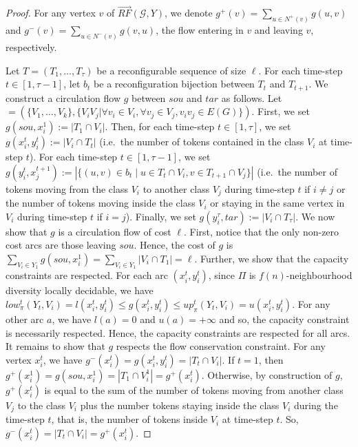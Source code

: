 \begin{proof}
  For any vertex $v$ of $\overrightarrow{RF}(\mathcal{G},Y)$, we denote $g^+(v)=\sum\limits_{u \in N^+(v)} g(u,v)$ and $g^-(v)= \sum\limits_{u \in N^-(v)} g(v,u)$, the flow entering in $v$ and leaving $v$, respectively.

  Let $T = (T_1,\dots,T_\tau)$ be a reconfigurable sequence of size $\ell$. For each time-step $t \in [1,\tau-1]$, let $b_t$ be a reconfiguration bijection between $T_t$ and $T_{t+1}$.  We construct a circulation flow $g$ between $sou$ and $tar$ as follows.
  Let \tndg$=(\{V_1,\ldots,V_k\}, \{V_iV_j | \forall v_i\in V_i, \forall v_j\in V_j, v_iv_j\in E(G)\})$. First, we set $g(sou,x^1_i):= |T_1 \cap V_i|$.
  Then, for each time-step $t \in [1,\tau]$, we set $g(x^t_i,y^t_i) := |V_i \cap T_t|$ (i.e.\ the number of tokens contained in the class $V_i$ at time-step $t$).
  For each time-step $t \in [1,\tau-1]$, we set
    $g(y^t_i,x^{t+1}_j) := | \{ (u,v) \in b_t \mid u \in T_t \cap V_i, v \in T_{t+1} \cap V_j\} |$ (i.e.\ the number of tokens moving from the class $V_i$ to another class $V_j$ during time-step $t$ if $i \neq j$ or the number of tokens moving inside the class $V_i$ or staying in the same vertex in $V_i$ during time-step $t$ if $i = j$).
    Finally, we set $g(y^\tau_i,tar):= |V_i \cap T_\tau|$. 
    We now show that $g$ is a circulation flow of cost $\ell$. First, notice that the only non-zero cost arcs are those leaving $sou$. Hence, the cost of $g$ is $\sum\limits_{V_i\in Y_1} g(sou,x^1_i) = \sum\limits_{V_i\in Y_1} |V_i \cap T_1| = \ell$.
    Further, we show that the capacity constraints are respected. For each arc $(x^t_i,y^t_i)$, since $\Pi$ is $f(n)$-neighbourhood diversity locally decidable, we have $low^t_\pi(Y_t,V_i) = l(x^t_i,y^t_i) \leq g(x^t_i,y^t_i) \leq up^t_\pi(Y_t,V_i) = u(x^t_i,y^t_i)$. For any other arc $a$, we have $l(a)=0$ and $u(a)=+\infty$ and so, the capacity constraint is necessarily respected. Hence, the capacity constraints are respected for all arcs.
    It remains to show that $g$ respects the flow conservation constraint. 
    For any vertex $x^t_i$, we have $g^-(x^t_i) = g(x^t_i,y^t_i) = |T_t \cap V_i|$. If $t=1$, then $g^+(x^1_i)=g(sou,x^1_i)= |T_1 \cap V^1_i|= g^+(x^t_i)$. Otherwise, by construction of $g$, $g^+(x^t_i)$ is equal to the sum of the number of tokens moving from another class $V_j$ to the class $V_i$ plus the number tokens staying inside the class $V_i$ during the time-step $t$, that is, the number of tokens inside $V_i$ at time-step $t$. So, $g^-(x^t_i) = |T_t \cap V_i| = g^+(x^t_i)$. 

\end{proof}
